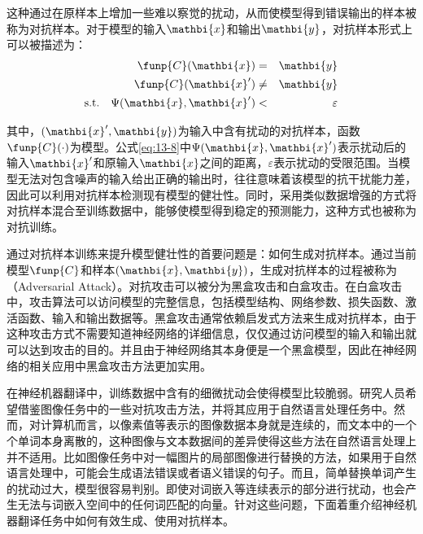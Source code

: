 \parinterval 这种通过在原样本上增加一些难以察觉的扰动，从而使模型得到错误输出的样本被称为对抗样本。对于模型的输入$\mathbi{x}$和输出$\mathbi{y}$，对抗样本形式上可以被描述为：
\begin{eqnarray}
\funp{C}(\mathbi{x}) &=& \mathbi{y}
\label{eq:13-6}\\
\funp{C}(\mathbi{x}') &\neq& \mathbi{y}
\label{eq:13-7}\\
\textrm{s.t.} \quad \Psi(\mathbi{x},\mathbi{x}') &<& \varepsilon
\label{eq:13-8}
\end{eqnarray}

\noindent 其中，$(\mathbi{x}',\mathbi{y})$为输入中含有扰动的对抗样本，函数$\funp{C}(\cdot)$为模型。公式\eqref{eq:13-8}中$\Psi(\mathbi{x},\mathbi{x}')$表示扰动后的输入$\mathbi{x}'$和原输入$\mathbi{x}$之间的距离，$\varepsilon$表示扰动的受限范围。当模型无法对包含噪声的输入给出正确的输出时，往往意味着该模型的抗干扰能力差，因此可以利用对抗样本检测现有模型的健壮性。同时，采用类似数据增强的方式将对抗样本混合至训练数据中，能够使模型得到稳定的预测能力，这种方式也被称为对抗训练。

\parinterval 通过对抗样本训练来提升模型健壮性的首要问题是：如何生成对抗样本。通过当前模型$\funp{C}$和样本$(\mathbi{x},\mathbi{y})$，生成对抗样本的过程被称为{\small{}}（Adversarial Attack）。对抗攻击可以被分为黑盒攻击和白盒攻击。在白盒攻击中，攻击算法可以访问模型的完整信息，包括模型结构、网络参数、损失函数、激活函数、输入和输出数据等。黑盒攻击通常依赖启发式方法来生成对抗样本，由于这种攻击方式不需要知道神经网络的详细信息，仅仅通过访问模型的输入和输出就可以达到攻击的目的。并且由于神经网络其本身便是一个黑盒模型，因此在神经网络的相关应用中黑盒攻击方法更加实用。

\parinterval 在神经机器翻译中，训练数据中含有的细微扰动会使得模型比较脆弱。研究人员希望借鉴图像任务中的一些对抗攻击方法，并将其应用于自然语言处理任务中。然而，对计算机而言，以像素值等表示的图像数据本身就是连续的，而文本中的一个个单词本身离散的，这种图像与文本数据间的差异使得这些方法在自然语言处理上并不适用。比如图像任务中对一幅图片的局部图像进行替换的方法，如果用于自然语言处理中，可能会生成语法错误或者语义错误的句子。而且，简单替换单词产生的扰动过大，模型很容易判别。即使对词嵌入等连续表示的部分进行扰动，也会产生无法与词嵌入空间中的任何词匹配的向量。针对这些问题，下面着重介绍神经机器翻译任务中如何有效生成、使用对抗样本。

